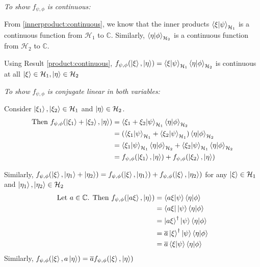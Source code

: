 \documentclass[12pt,twoside,fleqn]{report}
\makeatletter
\theoremstyle{thmstyle}
\renewenvironment{proof}[1][\proofname]{\par
\pushQED{\qed}%
\normalfont \topsep6\p@\@plus6\p@\relax
\trivlist
\item[\hskip\labelsep\itshape#1\@addpunct{.}]\mbox{}\par\nobreak\ignorespaces
}{%
    \popQED\endtrivlist\@endpefalse
    }
\makeatother
\begin{document}
\begin{proof}
    \emph{To show $f_{\psi, \phi}$ is continuous:}

    From \ref{innerproduct:continuous}, we know that the inner products $\braket{\xi|\psi}_{\mathcal{H}_1}$ is a continuous function from $\mathcal{H}_1$ to $\mathbb{C}$.
    Similarly, $\braket{\eta|\phi}_{\mathcal{H}_2}$ is a continuous function from $\mathcal{H}_2$ to $\mathbb{C}$.


    Using Result \ref{product:continuous}, $f_{\psi, \phi}(\ket\xi, \ket\eta) = \braket{\xi | \psi}_{\mathcal{H}_1} \braket{\eta|\phi}_{\mathcal{H}_2}$ is continuous at all $\ket\xi \in \mathcal{H}_1, \ket{\eta} \in \mathcal{H}_2$

    \emph{To show $f_{\psi, \phi}$ is conjugate linear in both variables:}

    Consider $\ket{\xi_1}, \ket{\xi_2} \in \mathcal{H}_1$ and $\ket{\eta} \in \mathcal{H}_2$.
    \begin{align*}
        \text{Then }f_{\psi,\phi}(\ket{\xi_1} + \ket{\xi_2}, \ket{\eta}) & = \braket{\xi_1 + \xi_2 | \psi}_{\mathcal{H}_1} \braket{\eta | \phi}_{\mathcal{H}_2}
        \\ & = (\braket{\xi_1 | \psi}_{\mathcal{H}_1}+ \braket{\xi_2 | \psi}_{\mathcal{H}_1}) \braket{\eta|\phi}_{\mathcal{H}_2}
        \\ & = \braket{\xi_1| \psi}_{\mathcal{H}_1}\braket{\eta|\phi}_{\mathcal{H}_2} + \braket{\xi_2|\psi}_{\mathcal{H}_1}\braket{\eta|\phi}_{\mathcal{H}_2}
        \\ & = f_{\psi,\phi}(\ket{\xi_1}, \ket{\eta}) + f_{\psi,\phi}(\ket{\xi_2},\ket{\eta})
    \end{align*}

    Similarly, $f_{\psi,\phi}(\ket\xi, \ket{\eta_1} + \ket{\eta_2}) = f_{\psi,\phi}(\ket\xi, \ket{\eta_1}) + f_{\psi,\phi}(\ket\xi , \ket{\eta_2})$
    for any $\ket\xi \in \mathcal{H}_1$ and $\ket{\eta_1}, \ket{\eta_2}  \in \mathcal{H}_2$
    \begin{align*}
    \text{Let } a \in \mathbb{C}\text{. Then }f_{\psi,\phi}(\ket{a \xi},\ket{\eta}) & = \braket{a \xi|\psi}\braket{\eta|\phi}
        \\ & = \bra{a \xi}\ket{\psi}\braket{\eta|\phi}
        \\ & = \ket{a \xi}^\dagger \ket{\psi} \braket{\eta|\phi}
        \\ & = \overline{a} \ket{\xi}^\dagger \ket{\psi} \braket{\eta|\phi}
        \\ & = \overline{a} \braket{\xi|\psi} \braket{\eta|\phi}
    \end{align*}
    Similarly, $f_{\psi,\phi}(\ket\xi, a \ket\eta) = \overline{a}f_{\psi,\phi}(\ket\xi, \ket\eta)$
\end{proof}
\end{document}
